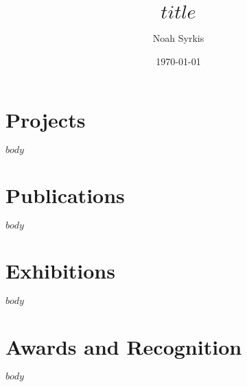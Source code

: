 \documentclass[12pt]{article}
\title{$title$}
\author{Noah Syrkis}
\date{\today}
\begin{document}
\maketitle

\section*{Projects}
$body$

\section*{Publications}
$body$

\section*{Exhibitions}
$body$

\section*{Awards and Recognition}
$body$
\end{document}
